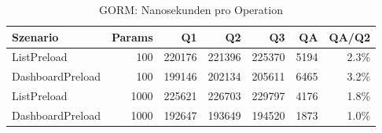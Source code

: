 \begin{table}[ht]
\centering
\caption{GORM: Nanosekunden pro Operation}
\begin{tabular}{lrrrrrr}
\toprule
Szenario & Params & Q1 & Q2 & Q3 & QA & QA/Q2 \\
\midrule
		ListPreload & 100 & 220176 & 221396 & 225370 & 5194 & 2.3\% \\
		DashboardPreload & 100 & 199146 & 202134 & 205611 & 6465 & 3.2\% \\
		ListPreload & 1000 & 225621 & 226703 & 229797 & 4176 & 1.8\% \\
		DashboardPreload & 1000 & 192647 & 193649 & 194520 & 1873 & 1.0\% \\
\bottomrule
\end{tabular}
\label{tab:benchmark_gorm_nsperop}
\end{table}
	